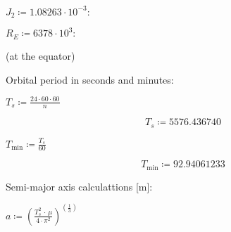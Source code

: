 \begin{appendices}
\begin{Maple Normal}
\end{Maple Normal}
\begin{Maple Normal}
{$ \displaystyle J_{2}\coloneqq  1.08263\cdot 10^{-3}\colon  $}
\end{Maple Normal}
\begin{Maple Normal}
{$ \displaystyle R_{E}\coloneqq 6378\cdot 10^{3}\colon  $}
\end{Maple Normal}
\begin{Maple Normal}
(at the equator)
\end{Maple Normal}
\begin{Maple Normal}

\end{Maple Normal}
\begin{Maple Normal}
Orbital period in seconds and minutes:
\end{Maple Normal}
\begin{Maple Normal}
{$ \displaystyle T_{s}\coloneqq \frac{24\cdot 60\cdot 60}{n} $}
\end{Maple Normal}
\begin{dmath}\label{(1)}
T_{s}\coloneqq  5576.436740
\end{dmath}
\begin{Maple Normal}
{$ \displaystyle T_{\min}\coloneqq \frac{T_{s}}{60} $}
\end{Maple Normal}
\begin{dmath}\label{(2)}
T_{\min}\coloneqq  92.94061233
\end{dmath}
\begin{Maple Normal}

\end{Maple Normal}
\begin{Maple Normal}
Semi-major axis calculattions [m]: 
\end{Maple Normal}
\mapleinput
{$ \displaystyle a \coloneqq (\frac{T_{s}^{2}\,\cdot \,\mu}{4\cdot \pi^{2}})^{\mathit{(\frac{1}{3})}} $}


\end{appendices}
